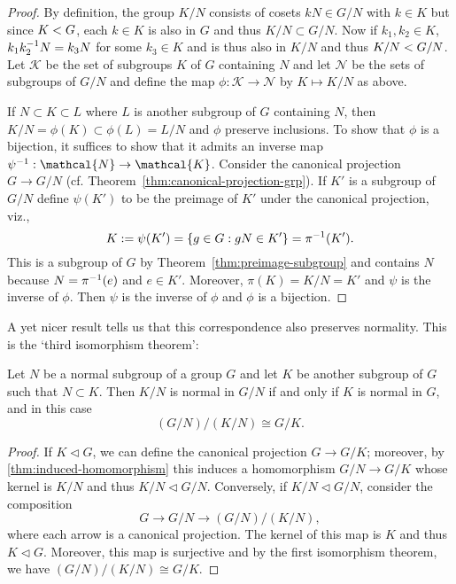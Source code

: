 \begin{proof}
     By definition, the group \(K/N\) consists of cosets \(kN \in G/N\) with \(k
     \in K\) but since \(K < G\), each \(k \in K\) is also in \(G\) and
     thus \(K/N \subset G/N\). Now if \(k_1, k_2 \in K\), \(k_1k_2^{-1} N =
     k_3N\) for some \(k_3 \in K\) and is thus also in \(K/N\) and thus \(K/N
     < G/N\). Let \(\mathcal{K}\) be the set of subgroups \(K\) of \(G\)
     containing \(N\) and let \(\mathcal{N}\) be the sets of subgroups of
     \(G/N\) and define the map \(\phi: \mathcal{K} \to \mathcal{N}\) by \(K
     \mapsto K/N\) as above.

     If \(N \subset K \subset L\) where \(L\) is another subgroup of \(G\)
     containing \(N\), then \(K/N = \phi(K) \subset \phi(L) = L/N\) and \(\phi\)
     preserve inclusions. To show that \(\phi\) is a bijection, it suffices to
     show that it admits an inverse map \(\psi\inv : \mathcal{N} \to
     \mathcal{K}\). Consider the canonical projection \(G \to G/N\) (cf.
     Theorem~\ref{thm:canonical-projection-grp}). If \(K'\) is a subgroup of
     \(G/N\) define \(\psi(K')\) to be the preimage of \(K'\) under the
     canonical projection, viz.,
     \[
        K := \psi(K') = \{g \in G : gN \in K'\} = \pi^{-1}(K').
     \]
     This is a subgroup of \(G\) by Theorem~\ref{thm:preimage-subgroup} and
     contains \(N\) because \(N = \pi^{-1}(e)\) and \(e \in K'\). Moreover,
     \(\pi(K) = K/N = K'\) and \(\psi\) is the inverse of \(\phi\). Then
     \(\psi\) is the inverse of \(\phi\) and \(\phi\) is a bijection.
\end{proof}

A yet nicer result tells us that this correspondence also preserves normality.
This is the `third isomorphism theorem':

\begin{theorem}
    \label{thm:third-isomorphism}
    Let \(N\) be a normal subgroup of a group \(G\) and let \(K\) be another
    subgroup of \(G\) such that \(N \subset K\). Then \(K/N\) is normal in
    \(G/N\) if and only if \(K\) is normal in \(G\), and in this case
    \[
        (G/N)/(K/N) \cong G/K.
    \]
\end{theorem}

\begin{proof}
    If \(K \triangleleft G\), we can define the canonical projection \(G \to
    G/K\); moreover, by \ref{thm:induced-homomorphism} this induces a
    homomorphism \(G/N \to G/K\) whose kernel is \(K/N\) and thus \(K/N
    \triangleleft G/N\). Conversely, if \(K/N \triangleleft G/N\), consider the
    composition
    \[
        G \to G/N \to (G/N)/(K/N),
    \]
    where each arrow is a canonical projection. The kernel of this map is \(K\)
    and thus \(K \triangleleft G\). Moreover, this map is surjective and by the
    first isomorphism theorem, we have \((G/N)/(K/N) \cong G/K\).
\end{proof}

